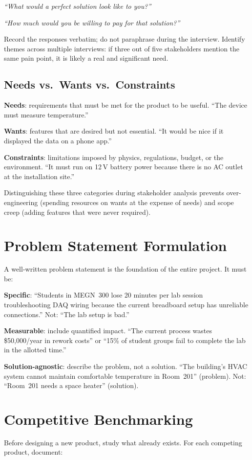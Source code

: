 \documentclass[11pt,letterpaper,twoside,openany]{book}
\begin{document}
\emph{``What would a perfect solution look like to you?''}

\emph{``How much would you be willing to pay for that solution?''}

Record the responses verbatim; do not paraphrase during the interview. Identify themes across multiple interviews: if three out of five stakeholders mention the same pain point, it is likely a real and significant need.

\subsection{Needs vs.\ Wants vs.\ Constraints}
\textbf{Needs}: requirements that must be met for the product to be useful. ``The device must measure temperature.''

\textbf{Wants}: features that are desired but not essential. ``It would be nice if it displayed the data on a phone app.''

\textbf{Constraints}: limitations imposed by physics, regulations, budget, or the environment. ``It must run on 12\,V battery power because there is no AC outlet at the installation site.''

Distinguishing these three categories during stakeholder analysis prevents over-engineering (spending resources on wants at the expense of needs) and scope creep (adding features that were never required).

\section{Problem Statement Formulation}
A well-written problem statement is the foundation of the entire project. It must be:

\textbf{Specific}: ``Students in MEGN~300 lose 20 minutes per lab session troubleshooting DAQ wiring because the current breadboard setup has unreliable connections.'' Not: ``The lab setup is bad.''

\textbf{Measurable}: include quantified impact. ``The current process wastes \$50{,}000/year in rework costs'' or ``15\% of student groups fail to complete the lab in the allotted time.''

\textbf{Solution-agnostic}: describe the problem, not a solution. ``The building's HVAC system cannot maintain comfortable temperature in Room~201'' (problem). Not: ``Room~201 needs a space heater'' (solution).

\section{Competitive Benchmarking}
Before designing a new product, study what already exists. For each competing product, document:
\end{document}
